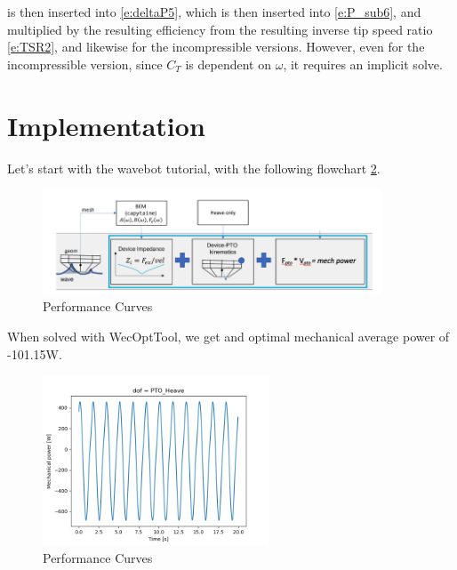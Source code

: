 \documentclass[conf]{new-aiaa}
\begin{document}
 is then inserted into \cref{e:deltaP5}, which is then inserted into \cref{e:P_sub6}, and multiplied by the resulting efficiency from the resulting inverse tip speed ratio \cref{e:TSR2}, and likewise for the incompressible versions. However, even for the incompressible version, since $C_T$ is dependent on $\omega$, it requires an implicit solve.  

\section{Implementation}

Let's start with the wavebot tutorial, with the following flowchart \cref{fig:WecOptFlowOrig}.

\begin{figure}[H]
\centering
\vspace{-6pt}
\includegraphics[trim={0.2cm 0cm 0cm 0cm},clip,width=0.9\textwidth]{WEC_mechanicalPower.png}
\vspace{-6pt}
\caption{Performance Curves}
\label{fig:WecOptFlowOrig}
\end{figure}

When solved with WecOptTool, we get and optimal mechanical average power of -101.15W.

\begin{figure}[H]
\centering
\vspace{-6pt}
\includegraphics[trim={0.0cm 0cm 0cm 0cm},clip,width=0.6\textwidth]{PTO_1.png}
\vspace{-6pt}
\caption{Performance Curves}
\label{fig:WecOptFlowOrig}
\end{figure}
\end{document}
